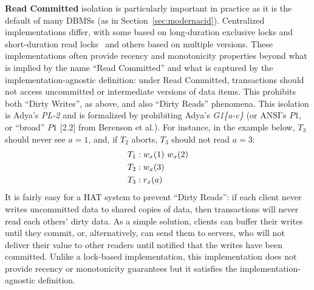 \textbf{Read Committed} isolation is particularly important in
practice as it is the default of many DBMSs (as in
Section~\ref{sec:modernacid}). Centralized implementations differ,
with some based on long-duration exclusive locks and short-duration
read locks~\cite{gray-isolation} and others based on multiple
versions. These implementations often provide recency and monotonicity
properties beyond what is implied by the name ``Read Committed'' and
what is captured by the implementation-agnostic definition: under
Read Committed, transactions should not access uncommitted or
intermediate versions of data items. This prohibits both ``Dirty
Writes'', as above, and also ``Dirty Reads'' phenomena.  This
isolation is Adya's \textit{PL-2} and is formalized by prohibiting
Adya's \textit{G1\{a-c\}} (or ANSI's $P1$, or ``broad'' $P1$ [2.2]
from Berenson et al.). For instance, in the example below, $T_3$
should never see $a=1$, and, if $T_2$ aborts, $T_3$ should not read
$a=3$:
\begin{align*}
\small\vspace{-1em}
T_1 &: w_x(1)~w_x(2)
\\T_2 &: w_x(3)\\
T_3 &: r_x(a)\vspace{-1em}
\end{align*}
It is fairly easy for a HAT system to prevent ``Dirty Reads'': if each
client never writes uncommitted data to shared copies of data, then
transactions will never read each others' dirty data. As a simple
solution, clients can buffer their writes until they commit, or,
alternatively, can send them to servers, who will not deliver their
value to other readers until notified that the writes have been
committed. Unlike a lock-based implementation, this implementation
does not provide recency or monotonicity guarantees but it satisfies
the implementation-agnostic definition.

